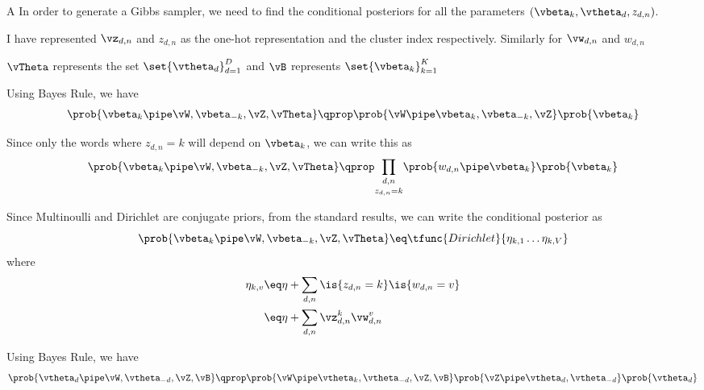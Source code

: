 \documentclass{article}
\begin{document}
\begin{question}

	\begin{qpart}{A}
		In order to generate a Gibbs sampler, we need to find the conditional posteriors for all the parameters $(\vbeta_k, \vtheta_d, z_{d, n})$.

		\begin{note}
			I have represented $\vz_{d, n}$ and $z_{d, n}$ as the one-hot representation and the cluster index respectively. Similarly for $\vw_{d, n}$ and $w_{d, n}$
		\end{note}

		\begin{note}
			$\vTheta$ represents the set $\set{\vtheta_d}_{d = 1}^D$ and $\vB$ represents $\set{\vbeta_k}_{k = 1}^K$
		\end{note}

		\begin{enumerate}

				Using Bayes Rule, we have
				\begin{align*}
					\prob{\vbeta_k \pipe \vW, \vbeta_{-k}, \vZ, \vTheta} \qprop \prob{\vW \pipe \vbeta_k, \vbeta_{-k}, \vZ} \prob{\vbeta_k}
				\end{align*}

				Since only the words where $z_{d,n} = k$ will depend on $\vbeta_k$, we can write this as
				\begin{align*}
					\prob{\vbeta_k \pipe \vW, \vbeta_{-k}, \vZ, \vTheta} \qprop \underset{z_{d, n} = k}{\prod_{d, n}} \prob{w_{d, n} \pipe \vbeta_k} \prob{\vbeta_k}
				\end{align*}

				Since Multinoulli and Dirichlet are conjugate priors, from the standard results, we can write the conditional posterior as
				\begin{equation}
					\prob{\vbeta_k \pipe \vW, \vbeta_{-k}, \vZ, \vTheta} \eq \tfunc{Dirichlet}{\eta_{k, 1} \dots \eta_{k, V}}
				\end{equation}
				where
				\begin{align*}
					\eta_{k, v} &\eq \eta + \sum_{d, n} \is{z_{d, n} = k} \is{w_{d, n} = v} \\
					&\eq \eta + \sum_{d, n} \vz_{d, n}^{k} \vw_{d, n}^{v}
				\end{align*}


				Using Bayes Rule, we have
				\begin{align*}
					\prob{\vtheta_d \pipe \vW, \vtheta_{-d}, \vZ, \vB} \qprop \prob{\vW \pipe \vtheta_k, \vtheta_{-d}, \vZ, \vB} \prob{\vZ \pipe \vtheta_d, \vtheta_{-d}} \prob{\vtheta_d}
				\end{align*}


\end{enumerate}
\end{qpart}
\end{question}
\end{document}

